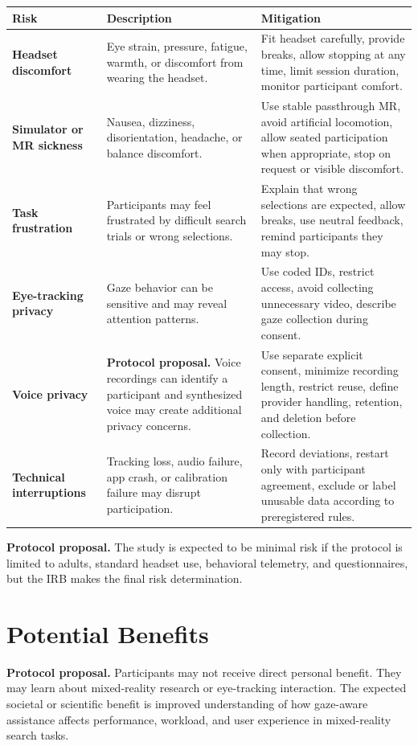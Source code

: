 \documentclass[11pt,letterpaper]{article}
\newcommand{\status}[1]{\textbf{#1.}}
\newcommand{\field}[1]{\textbf{#1}}
\begin{document}
\begin{longtable}{p{}p{}p{}}
\toprule
\field{Risk} & \field{Description} & \field{Mitigation} \\
\midrule
\field{Headset discomfort} & Eye strain, pressure, fatigue, warmth, or discomfort from wearing the headset. & Fit headset carefully, provide breaks, allow stopping at any time, limit session duration, monitor participant comfort. \\
\field{Simulator or MR sickness} & Nausea, dizziness, disorientation, headache, or balance discomfort. & Use stable passthrough MR, avoid artificial locomotion, allow seated participation when appropriate, stop on request or visible discomfort. \\
\field{Task frustration} & Participants may feel frustrated by difficult search trials or wrong selections. & Explain that wrong selections are expected, allow breaks, use neutral feedback, remind participants they may stop. \\
\field{Eye-tracking privacy} & Gaze behavior can be sensitive and may reveal attention patterns. & Use coded IDs, restrict access, avoid collecting unnecessary video, describe gaze collection during consent. \\
\field{Voice privacy} & \status{Protocol proposal} Voice recordings can identify a participant and synthesized voice may create additional privacy concerns. & Use separate explicit consent, minimize recording length, restrict reuse, define provider handling, retention, and deletion before collection. \\
\field{Technical interruptions} & Tracking loss, audio failure, app crash, or calibration failure may disrupt participation. & Record deviations, restart only with participant agreement, exclude or label unusable data according to preregistered rules. \\
\bottomrule
\end{longtable}

\status{Protocol proposal} The study is expected to be minimal risk if the protocol is limited to adults, standard headset use, behavioral telemetry, and questionnaires, but the IRB makes the final risk determination.

\section{Potential Benefits}

\status{Protocol proposal} Participants may not receive direct personal benefit. They may learn about mixed-reality research or eye-tracking interaction. The expected societal or scientific benefit is improved understanding of how gaze-aware assistance affects performance, workload, and user experience in mixed-reality search tasks.
\end{document}
